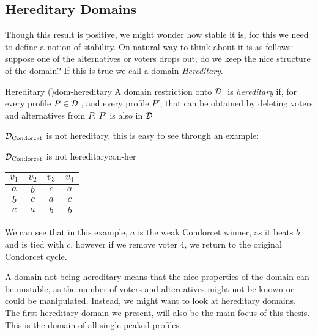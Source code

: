 \subsection{Hereditary Domains}

Though this result is positive, we might wonder how stable it is, for this we need to define a notion of stability. On natural way to think about it is as follows: suppose one of the alternatives or voters drops out, do we keep the nice structure of the domain? If this is true we call a domain \emph{Hereditary}.

\begin{definition}{Hereditary \textnormal{(\citet{elkindPreferenceRestrictionsComputational2022})}}{dom-hereditary}
	A domain restriction onto $\mathcal{D}_{\textnormal{ }}$ is \emph{hereditary} if, for every profile $P \in \mathcal{D}_{\textnormal{ }}$, and every profile $P'$, that can be obtained by deleting voters and alternatives from $P$, $P'$ is also in $\mathcal{D}_{\textnormal{ }}$
\end{definition}

$\mathcal{D}_{\textnormal{Condorcet}}$ is not hereditary, this is easy to see through an example:

\begin{example}{$\mathcal{D}_{\textnormal{Condorcet}}$ is not hereditary}{con-her}
	\begin{minipage}{0.25\linewidth}
		\begin{tabular}{cccc}
			\toprule
			$v_1$ & $v_2$ & $v_3$ & $v_4$ \\
			\midrule
			$a$   & $b$   & $c$   & $a$   \\
			$b$   & $c$   & $a$   & $c$   \\
			$c$   & $a$   & $b$   & $b$   \\
			\bottomrule
		\end{tabular}
	\end{minipage}
	\begin{minipage}[b]{0.70\linewidth}
		We can see that in this example, $a$ is the weak Condorcet winner, as it beats $b$ and is tied with $c$, however if we remove voter 4, we return to the original Condorcet cycle.
	\end{minipage}
\end{example}

A domain not being hereditary means that the nice properties of the domain can be unstable, as the number of voters and alternatives might not be known or could be manipulated. Instead, we might want to look at hereditary domains. The first hereditary domain we present, will also be the main focus of this thesis. This is the domain of all single-peaked profiles.



